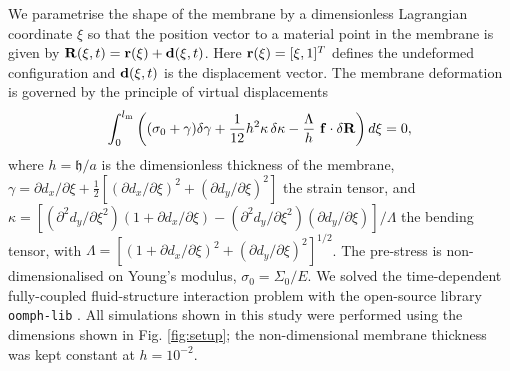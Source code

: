 \documentclass[aps,prl,reprint,superscriptaddress,floatfix]{revtex4-1}
\begin{document}
We parametrise the shape of the membrane by a dimensionless
Lagrangian coordinate $\xi$ so that the position vector
to a material point in the membrane is
given by ${\bf R}(\xi,t) = {\bf r}(\xi) + {\bf d}(\xi,t)$. Here ${\bf
  r}(\xi) = [\xi, 1]^T$ defines the undeformed configuration and $
{\bf d}(\xi,t)$ is the displacement vector. The membrane
deformation is governed by the principle of virtual displacements
\begin{equation}
\label{eq:virtualdisplacement}
\int_{0}^{l_\text{m}} \left((\sigma_0 + \gamma)\delta \gamma
+ \frac{1}{12}h^2\kappa \,\delta\kappa -
\frac{\Lambda}{h} \ {\bf f} \cdot \delta {\bf R} \right) d\xi = 0,
\end{equation}
where $h=\mathfrak{h}/a$ is the dimensionless thickness of the membrane,
$\gamma=\partial d_x/\partial {\xi} + \frac{1}{2}[(\partial d_x/\partial
  {\xi})^2 + (\partial d_y/\partial {\xi})^2]$ the strain tensor, and
$\kappa = [(\partial^2 d_y/\partial {\xi^2})(1+\partial d_x/\partial
  {\xi}) - (\partial^2 d_y/\partial {{\xi}^2}) (\partial d_y/\partial
  {\xi})]/\Lambda$ the bending tensor, with $\Lambda=[(1+\partial
  d_x/\partial \xi)^2+(\partial d_y/\partial {\xi})^2]^{1/2}$.
The pre-stress is non-dimensionalised on Young's modulus, 
$\sigma_0 = \Sigma_0/E$. We solved the time-dependent fully-coupled 
fluid-structure interaction problem with
the open-source library {\tt oomph-lib} \cite{OOmph,heil2006}.
All simulations shown in this study were performed using the
dimensions shown in Fig. \ref{fig:setup}; the non-dimensional 
membrane thickness was kept constant at $h=10^{-2}$.
\end{document}

